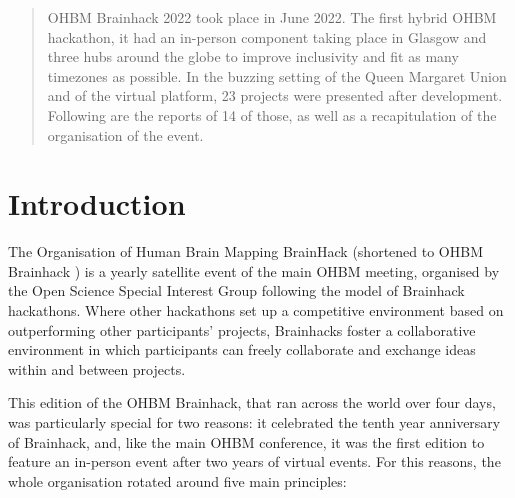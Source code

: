 \documentclass[12pt,a4paper,onecolumn]{article}
\let\Oldsection\section
\renewcommand{\section}{\FloatBarrier\Oldsection}
\begin{document}
\vspace{-0.25in} %
{\let\newpage\relax\maketitle} %
\vspace{-1in} %



\begin{abstract}
OHBM Brainhack 2022 took place in June 2022. The first hybrid OHBM hackathon, it had an in-person component taking place in Glasgow and three hubs around the globe to improve inclusivity and fit as many timezones as possible.
In the buzzing setting of the Queen Margaret Union and of the virtual platform, 23 projects were presented after development.
Following are the reports of 14 of those, as well as a recapitulation of the organisation of the event. 
\end{abstract}

\section*{Introduction}

The Organisation of Human Brain Mapping BrainHack (shortened to OHBM
Brainhack ) is a yearly satellite event of the main OHBM
meeting, organised by the Open Science Special Interest Group following
the model of Brainhack hackathons\supercite{Gau2021}.
Where other hackathons set up a competitive environment based on
outperforming other participants' projects, Brainhacks foster a
collaborative environment in which participants can freely collaborate
and exchange ideas within and between projects.

This edition of the OHBM Brainhack, that ran across the world over four
days, was particularly special for two reasons: it celebrated the tenth
year anniversary of Brainhack, and, like the main OHBM conference, it
was the first edition to feature an in-person event after two years of
virtual events. For this reasons, the whole organisation rotated around
five main principles:
\end{document}
